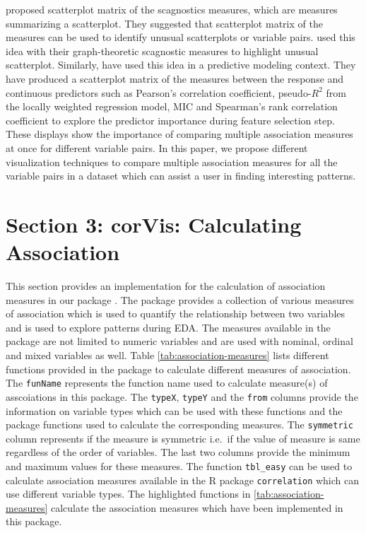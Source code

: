 \citet{tukey1985computer} proposed scatterplot matrix of the scagnostics
measures, which are measures summarizing a scatterplot. They suggested
that scatterplot matrix of the measures can be used to identify unusual
scatterplots or variable pairs. \citet{wilkinson2005graph} used this
idea with their graph-theoretic scagnostic measures to highlight unusual
scatterplot. Similarly, \citet{kuhn2013applied} have used this idea in a
predictive modeling context. They have produced a scatterplot matrix of
the measures between the response and continuous predictors such as
Pearson's correlation coefficient, pseudo-\(R^2\) from the locally
weighted regression model, MIC and Spearman's rank correlation
coefficient to explore the predictor importance during feature selection
step. These displays show the importance of comparing multiple
association measures at once for different variable pairs. In this
paper, we propose different visualization techniques to compare multiple
association measures for all the variable pairs in a dataset which can
assist a user in finding interesting patterns.

\hypertarget{section-3-corvis-calculating-association}{%
\section{Section 3: corVis: Calculating
Association}\label{section-3-corvis-calculating-association}}

This section provides an implementation for the calculation of
association measures in our package . The package
provides a collection of various measures of association which is used
to quantify the relationship between two variables and is used to
explore patterns during EDA. The measures available in the package are
not limited to numeric variables and are used with nominal, ordinal and
mixed variables as well. Table \ref{tab:association-measures} lists
different functions provided in the package to calculate different
measures of association. The \texttt{funName} represents the function
name used to calculate measure(s) of asscoiations in this package. The
\texttt{typeX}, \texttt{typeY} and the \texttt{from} columns provide the
information on variable types which can be used with these functions and
the package functions used to calculate the corresponding measures. The
\texttt{symmetric} column represents if the measure is symmetric i.e.~if
the value of measure is same regardless of the order of variables. The
last two columns provide the minimum and maximum values for these
measures. The function \texttt{tbl\_easy} can be used to calculate
association measures available in the R package \texttt{correlation}
which can use different variable types. The highlighted functions in
\ref{tab:association-measures} calculate the association measures which
have been implemented in this package.

